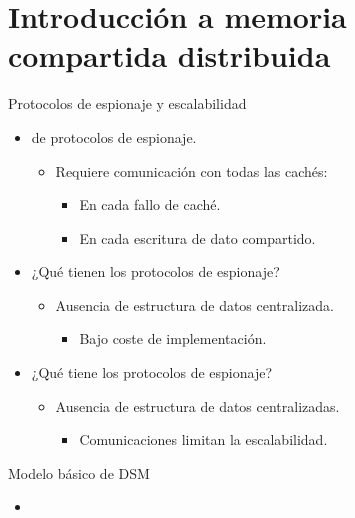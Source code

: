 \section{Introducción a memoria compartida distribuida}

\begin{frame}[t]{Protocolos de espionaje y escalabilidad}
\begin{itemize}
  \item {} de protocolos de espionaje.
    \begin{itemize}
      \item Requiere comunicación con todas las cachés:
        \begin{itemize}
          \item En cada fallo de caché.
          \item En cada escritura de dato compartido.
        \end{itemize}
    \end{itemize}

  \item ¿Qué  tienen los protocolos de espionaje?
    \begin{itemize}
      \item Ausencia de estructura de datos centralizada.
        \begin{itemize}
          \item Bajo coste de implementación.
        \end{itemize}
    \end{itemize}

  \item ¿Qué  tiene los protocolos de espionaje?
    \begin{itemize}
      \item Ausencia de estructura de datos centralizadas.
        \begin{itemize}
          \item Comunicaciones limitan la escalabilidad.
        \end{itemize}
    \end{itemize}
\end{itemize}
\end{frame}

\begin{frame}{Modelo básico de DSM}
\makebox[\textwidth][c]{

}
\begin{itemize}
  \item {}
\end{itemize}
\end{frame}


